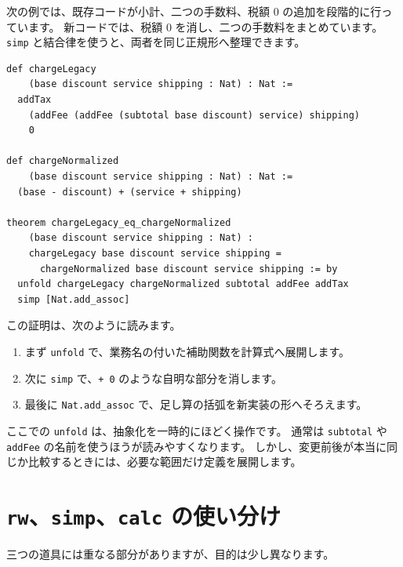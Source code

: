 
次の例では、既存コードが小計、二つの手数料、税額 0 の追加を段階的に行っています。
新コードでは、税額 0 を消し、二つの手数料をまとめています。
\texttt{simp} と結合律を使うと、両者を同じ正規形へ整理できます。

\begin{listing}[htbp]
\begin{verbatim}
def chargeLegacy
    (base discount service shipping : Nat) : Nat :=
  addTax
    (addFee (addFee (subtotal base discount) service) shipping)
    0

def chargeNormalized
    (base discount service shipping : Nat) : Nat :=
  (base - discount) + (service + shipping)

theorem chargeLegacy_eq_chargeNormalized
    (base discount service shipping : Nat) :
    chargeLegacy base discount service shipping =
      chargeNormalized base discount service shipping := by
  unfold chargeLegacy chargeNormalized subtotal addFee addTax
  simp [Nat.add_assoc]
\end{verbatim}
\caption{\texttt{chargeLegacy\_eq\_chargeNormalized}}
\label{lst:ch18-price-normalization}
\end{listing}

この証明は、次のように読みます。

\begin{enumerate}
\item まず \texttt{unfold} で、業務名の付いた補助関数を計算式へ展開します。
\item 次に \texttt{simp} で、\texttt{+ 0} のような自明な部分を消します。
\item 最後に \texttt{Nat.add\_assoc} で、足し算の括弧を新実装の形へそろえます。
\end{enumerate}

ここでの \texttt{unfold} は、抽象化を一時的にほどく操作です。
通常は \texttt{subtotal} や \texttt{addFee} の名前を使うほうが読みやすくなります。
しかし、変更前後が本当に同じか比較するときには、必要な範囲だけ定義を展開します。

\section{\texorpdfstring{\texttt{rw}、\texttt{simp}、\texttt{calc} の使い分け}{rw、simp、calc の使い分け}}

三つの道具には重なる部分がありますが、目的は少し異なります。


